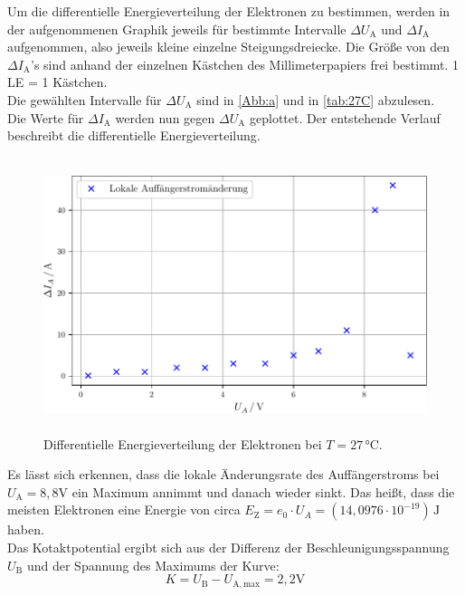 Um die differentielle Energieverteilung der Elektronen zu bestimmen, werden in der aufgenommenen 
Graphik jeweils für bestimmte Intervalle $\Delta U_{\mathrm{A}}$ und $\Delta I_{\mathrm{A}}$ aufgenommen, also jeweils
kleine einzelne Steigungsdreiecke. Die Größe von den $\Delta I_{\mathrm{A}}$'s 
sind anhand der einzelnen Kästchen des Millimeterpapiers frei bestimmt. 1 LE = 1 Kästchen.\\
Die gewählten Intervalle für $\Delta U_{\mathrm{A}}$ sind in \autoref{Abb:a} und in \autoref{tab:27C} abzulesen.\\
Die Werte für $\Delta I_{\mathrm{A}}$ werden nun gegen $\Delta U_{\mathrm{A}}$ geplottet. Der entstehende Verlauf
beschreibt die differentielle Energieverteilung.\\

\begin{figure}[H]
  \centering
  \includegraphics[height=8cm]{build/27Grad.pdf}
  \caption{Differentielle Energieverteilung der Elektronen bei $T=27\,\si{\celsius}$.}
  \label{fig:27GradDiff}
\end{figure}

Es lässt sich erkennen, dass die lokale Änderungsrate des Auffängerstroms
bei $U_{\mathrm{A}} = 8,8 \si{\volt}$ ein Maximum annimmt und danach wieder sinkt. Das heißt,
dass die meisten Elektronen eine Energie von circa $E_{\mathrm{Z}} = e_0 \cdot U_A = (14,0976 \cdot 10^{-19}) \, \si{\joule}$
haben.\\
Das Kotaktpotential ergibt sich aus der Differenz der Beschleunigungsspannung $U_{\mathrm{B}}$ und der Spannung
des Maximums der Kurve:
\begin{equation}
  K = U_{\mathrm{B}} - U_{\mathrm{A,max}} = 2,2 \si{\volt}
\end{equation}


